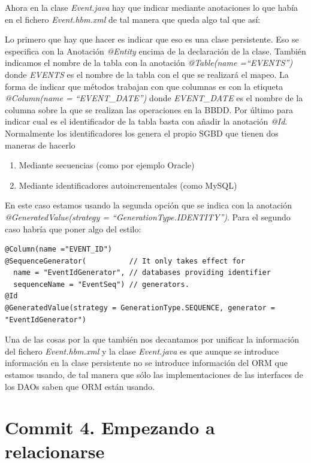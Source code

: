 \documentclass{article}
\begin{document}
	Ahora en la clase \emph{Event.java} hay que indicar mediante anotaciones lo que había en el fichero \emph{Event.hbm.xml} de tal manera que queda algo tal que así:


	Lo primero que hay que hacer es indicar que eso es una clase persistente. Eso se especifica con la Anotación \emph{@Entity} encima de la declaración de la clase. También indicamos el nombre de la tabla con la anotación \emph{@Table(name =``EVENTS'')} donde \emph{EVENTS} es el nombre de la tabla con el que se realizará el mapeo. La forma de indicar que métodos trabajan con que columnas es con la etiqueta \emph{@Column(name = ``EVENT\_DATE'')} donde \emph{EVENT\_DATE} es el nombre de la columna sobre la que se realizan las operaciones en la BBDD. Por último para indicar cual es el identificador de la tabla basta con añadir la anotación \emph{@Id}. Normalmente los identificadores los genera el propio SGBD que tienen dos maneras de hacerlo
{\setlength{\parskip}{0mm}
\begin{enumerate}
	\item Mediante secuencias (como por ejemplo Oracle)
	\item Mediante identificadores autoincrementales (como MySQL)
\end{enumerate}
}

	En este caso estamos usando la segunda opción que se indica con la anotación \emph{@GeneratedValue(strategy = ``GenerationType.IDENTITY'')}. Para el segundo caso habría que poner algo del estilo:
\begin{lstlisting}[style=java]
@Column(name ="EVENT_ID")
@SequenceGenerator(          // It only takes effect for
  name = "EventIdGenerator", // databases providing identifier
  sequenceName = "EventSeq") // generators.
@Id
@GeneratedValue(strategy = GenerationType.SEQUENCE, generator = "EventIdGenerator")
\end{lstlisting}

	Una de las cosas por la que también nos decantamos por unificar la información del fichero \emph{Event.hbm.xml} y la clase \emph{Event.java} es que aunque se introduce información en la clase persistente no se introduce información del ORM que estamos usando, de tal manera que sólo las implementaciones de las interfaces de los DAOs saben que ORM están usando.

\section{Commit 4.  Empezando a relacionarse}
\end{document}
